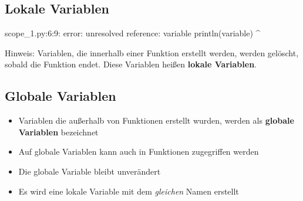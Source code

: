 \subsection{Lokale Variablen}
\begin{frame}[fragile]
    \slidehead
    \vspace{-1em}
    \pause
    \vspace{-1em}
    \begin{commandshell}[fontsize=\footnotesize][minted language=text,top=0cm,bottom=0cm]
        scope_1.py:6:9: error: unresolved reference: variable
        println(variable)
                ^
    \end{commandshell}
    \vspace{-1em}
    \begin{block}{Hinweis:}
        Variablen, die innerhalb einer Funktion erstellt werden, werden gelöscht, sobald die Funktion endet.
        Diese Variablen heißen \textbf{lokale Variablen}.
    \end{block}
\end{frame}

\subsection{Globale Variablen}
\begin{frame}
    \slidehead
    \begin{itemize}
        \item Variablen die außerhalb von Funktionen erstellt wurden, werden als \textbf{globale Variablen} bezeichnet
        \item Auf globale Variablen kann auch in Funktionen zugegriffen werden
    \end{itemize}
\end{frame}

\begin{frame}
    \slidehead
    \begin{itemize}
        \item Die globale Variable  bleibt unverändert
        \item Es wird eine lokale Variable mit dem \textit{gleichen} Namen erstellt
    \end{itemize}
\end{frame}


